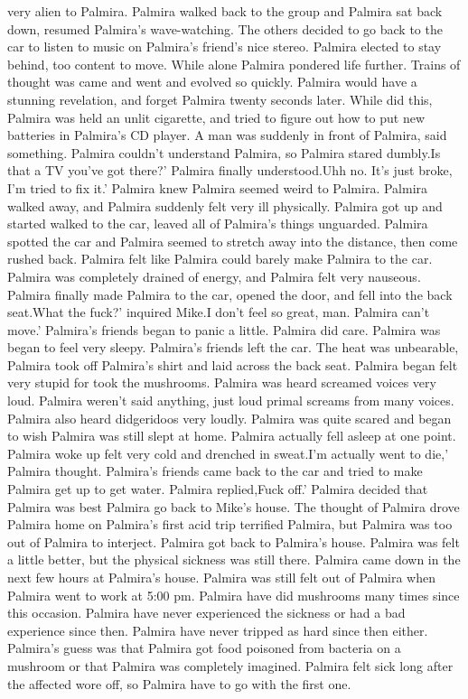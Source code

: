 \documentclass[12pt]{book}
\begin{document}
very alien to Palmira. Palmira walked back to the group and Palmira sat back down, resumed Palmira's wave-watching. The others decided to go back to the car to listen to music on Palmira's friend's nice stereo. Palmira elected to stay behind, too content to move. While alone Palmira pondered life further. Trains of thought was came and went and evolved so quickly. Palmira would have a stunning revelation, and forget Palmira twenty seconds later. While did this, Palmira was held an unlit cigarette, and tried to figure out how to put new batteries in Palmira's CD player. A man was suddenly in front of Palmira, said something. Palmira couldn't understand Palmira, so Palmira stared dumbly.Is that a TV you've got there?' Palmira finally understood.Uhh no. It's just broke, I'm tried to fix it.' Palmira knew Palmira seemed weird to Palmira. Palmira walked away, and Palmira suddenly felt very ill physically. Palmira got up and started walked to the car, leaved all of Palmira's things unguarded. Palmira spotted the car and Palmira seemed to stretch away into the distance, then come rushed back. Palmira felt like Palmira could barely make Palmira to the car. Palmira was completely drained of energy, and Palmira felt very nauseous. Palmira finally made Palmira to the car, opened the door, and fell into the back seat.What the fuck?' inquired Mike.I don't feel so great, man. Palmira can't move.' Palmira's friends began to panic a little. Palmira did care. Palmira was began to feel very sleepy. Palmira's friends left the car. The heat was unbearable, Palmira took off Palmira's shirt and laid across the back seat. Palmira began felt very stupid for took the mushrooms. Palmira was heard screamed voices very loud. Palmira weren't said anything, just loud primal screams from many voices. Palmira also heard didgeridoos very loudly. Palmira was quite scared and began to wish Palmira was still slept at home. Palmira actually fell asleep at one point. Palmira woke up felt very cold and drenched in sweat.I'm actually went to die,' Palmira thought. Palmira's friends came back to the car and tried to make Palmira get up to get water. Palmira replied,Fuck off.' Palmira decided that Palmira was best Palmira go back to Mike's house. The thought of Palmira drove Palmira home on Palmira's first acid trip terrified Palmira, but Palmira was too out of Palmira to interject. Palmira got back to Palmira's house. Palmira was felt a little better, but the physical sickness was still there. Palmira came down in the next few hours at Palmira's house. Palmira was still felt out of Palmira when Palmira went to work at 5:00 pm. Palmira have did mushrooms many times since this occasion. Palmira have never experienced the sickness or had a bad experience since then. Palmira have never tripped as hard since then either. Palmira's guess was that Palmira got food poisoned from bacteria on a mushroom or that Palmira was completely imagined. Palmira felt sick long after the affected wore off, so Palmira have to go with the first one.
\end{document}
